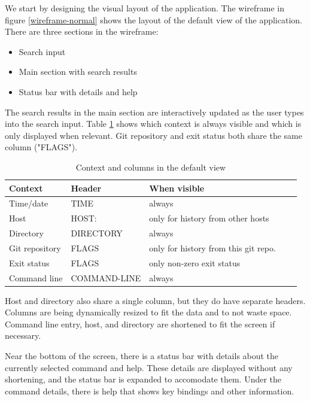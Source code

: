 We start by designing the visual layout of the application.
The wireframe in figure \ref{wireframe-normal} shows the layout of the default view of the application. There are three sections in the wireframe:

\begin{itemize}
\item Search input
\item Main section with search results
\item Status bar with details and help
\end{itemize}




The search results in the main section are interactively updated as the user types into the search input. Table \ref{tab:design-columns} shows which context is always visible and which is only displayed when relevant. Git repository and exit status both share the same column ("FLAGS"). 

\begin{table}[h]
\centering
\begin{tabular}{lllll}
\hline \hline
Context & Header & When visible \\\hline
Time/date & TIME & always \\ 
Host & HOST: & only for history from other hosts \\ 
Directory & DIRECTORY & always \\ 
Git repository & FLAGS & only for history from this git repo. \\ 
Exit status & FLAGS & only non-zero exit status \\ 
Command line & COMMAND-LINE & always \\\hline \hline
\end{tabular}
\caption{Context and columns in the default view}
\label{tab:design-columns}
\end{table}

Host and directory also share a single column, but they do have separate headers. Columns are being dynamically resized to fit the data and to not waste space. Command line entry, host, and directory are shortened to fit the screen if necessary. 

Near the bottom of the screen, there is a status bar with details about the currently selected command and help. These details are displayed without any shortening, and the status bar is expanded to accomodate them. Under the command details, there is help that shows key bindings and other information.


